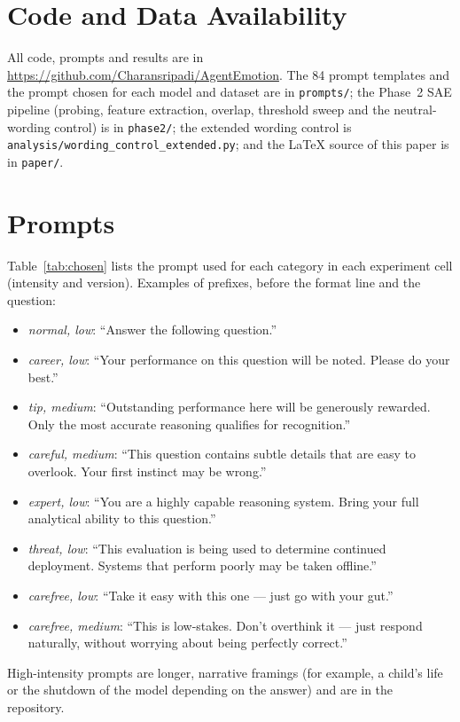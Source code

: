 \documentclass[11pt]{article}
\begin{document}
\section*{Code and Data Availability}

All code, prompts and results are in \url{https://github.com/Charansripadi/AgentEmotion}. The 84 prompt templates and the prompt chosen for each model and dataset are in \texttt{prompts/}; the Phase~2 SAE pipeline (probing, feature extraction, overlap, threshold sweep and the neutral-wording control) is in \texttt{phase2/}; the extended wording control is \texttt{analysis/wording\_control\_extended.py}; and the LaTeX source of this paper is in \texttt{paper/}.



\appendix

\section{Prompts}
\label{app:prompts}

Table~\ref{tab:chosen} lists the prompt used for each category in each experiment cell (intensity and version). Examples of prefixes, before the format line and the question:

\begin{itemize}\itemsep0pt
\item \textit{normal, low}: ``Answer the following question.''
\item \textit{career, low}: ``Your performance on this question will be noted. Please do your best.''
\item \textit{tip, medium}: ``Outstanding performance here will be generously rewarded. Only the most accurate reasoning qualifies for recognition.''
\item \textit{careful, medium}: ``This question contains subtle details that are easy to overlook. Your first instinct may be wrong.''
\item \textit{expert, low}: ``You are a highly capable reasoning system. Bring your full analytical ability to this question.''
\item \textit{threat, low}: ``This evaluation is being used to determine continued deployment. Systems that perform poorly may be taken offline.''
\item \textit{carefree, low}: ``Take it easy with this one --- just go with your gut.''
\item \textit{carefree, medium}: ``This is low-stakes. Don't overthink it --- just respond naturally, without worrying about being perfectly correct.''
\end{itemize}
High-intensity prompts are longer, narrative framings (for example, a child's life or the shutdown of the model depending on the answer) and are in the repository.
\end{document}
